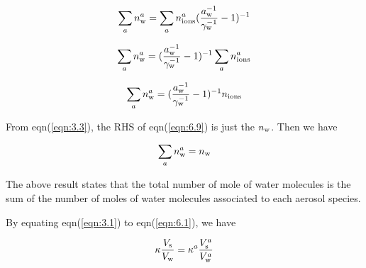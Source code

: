 \documentclass[12pt]{article}
\begin{document}
\begin{equation}\label{eqn:6.7}
\sum_{a} n_{\rm w}^{a}=\sum_{a}n_{\rm ions}^{a}(\frac{a_{\rm w}^{-1}}{\gamma_{\rm w}^{-1}}-1)^{-1}
\end{equation}

\begin{equation}\label{eqn:6.8}
\sum_{a} n_{\rm w}^{a}=(\frac{a_{\rm w}^{-1}}{\gamma_{\rm w}^{-1}}-1)^{-1}\sum_{a}n_{\rm ions}^{a}
\end{equation}

\begin{equation}\label{eqn:6.9}
\sum_{a} n_{\rm w}^{a}=(\frac{a_{\rm w}^{-1}}{\gamma_{\rm w}^{-1}}-1)^{-1} n_{\rm ions}
\end{equation}

From eqn(\ref{eqn:3.3}), the RHS of eqn(\ref{eqn:6.9}) is just the $n_{\rm w}$. Then we have 

\begin{equation}\label{eqn:6.10}
\sum_{a} n_{\rm w}^{a}=n_{\rm w}
\end{equation}

The above result states that the total number of mole of water molecules is the sum of the number of moles of water molecules associated to each aerosol species. 






By equating eqn(\ref{eqn:3.1}) to eqn(\ref{eqn:6.1}), we have

\begin{equation}\label{eqn:6.14}
\kappa \frac{V_{\rm s}}{V_{\rm w}}= \kappa^{a} \frac{V_{\rm s}^{a}}{V_{\rm w}^{a}}
\end{equation}
\end{document}
